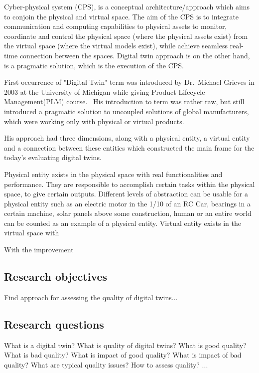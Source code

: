 \documentclass[conference]{IEEEtran}
\begin{document}
    Cyber-physical system (CPS), is a conceptual architecture/approach which aims to conjoin the physical and virtual space. 
    The aim of the CPS is to integrate communication and computing capabilities to physical assets to monitor, coordinate and control the physical space (where the physical assets exist) from the virtual space (where the virtual models exist), while achieve seamless real-time connection between the spaces.
    Digital twin approach is on the other hand, is a pragmatic solution, which is the execution of the CPS.~\cite{TAO20193}
    
    First occurrence of "Digital Twin" term  was introduced by Dr.~Michael Grieves in 2003 at the University of Michigan while giving  Product Lifecycle Management(PLM) course.~\cite{article}
    His introduction to term was rather raw, but still introduced a pragmatic solution to uncoupled solutions of global manufacturers, which were working only with physical or virtual products.

    His approach had three dimensions, along with a physical entity, a virtual entity and a connection between these entities which constructed the main frame for the today's evaluating digital twins.~\cite{article}

    Physical entity exists in the physical space with real functionalities and performance. They are responsible to accomplish certain tasks within the physical space, to give certain outputs.
    Different levels of abstraction can be usable for a physical entity such as an electric motor in the 1/10 of an RC Car, bearings in a certain machine, solar panels above some construction, human or an entire world can be counted as an example of a physical entity.
    Virtual entity exists in the virtual space with 

    With the improvement 
    

    \subsection{Research objectives}

    Find approach for assessing the quality of digital twins...

    \subsection{Research questions}

    What is a digital twin? What is quality of digital twins? What is good quality? What is bad quality? What is impact of good quality? What is impact of bad quality? What are typical quality issues? How to assess quality? ...
\end{document}
